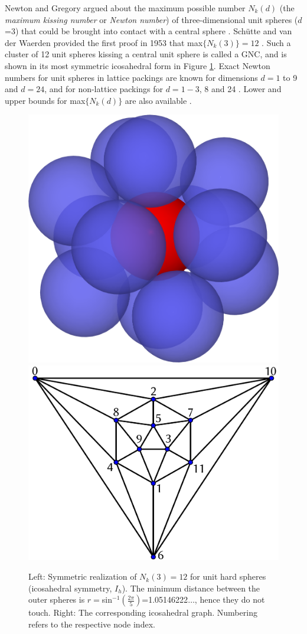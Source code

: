 Newton and Gregory argued about the maximum possible number $N_k(d)$ (the
\textit{maximum kissing number} or \textit{Newton number}) of three-dimensional
unit spheres ($d$=3) that could be brought into contact with a central sphere
\autocite{Pfender_KissingNumbersSphere_2004}. Sch\"utte and van der Waerden
provided the first proof in 1953 that max$\{N_k(3)\}=12$
\autocite{Schutte_ProblemdreizehnKugeln_1952}. Such a cluster of 12 unit
spheres kissing a central unit sphere is called a \ac{GNC}, and is shown in its
most symmetric icosahedral form in Figure \ref{fig:GN}. Exact Newton numbers
for unit spheres in lattice packings are known for dimensions $d=1$ to 9 and
$d=24$, and for non-lattice packings for $d=1-3$, 8 and 24
\autocite{conway-2013book,Musin_proof24cellconjecture_2017}.  Lower and upper
bounds for max$\{N_k(d)\}$ are also available
\autocite{Mittelmann_Highaccuracysemidefiniteprogramming_2010,conway-2013book}. 
\begin{figure}[htb]
    \centering
    \includegraphics[width=.4\textwidth]{gregory-newton/Kissing-3d.png} \quad
    \includegraphics[width=.45\textwidth]{gregory-newton/ico.pdf}
    \caption{Left: Symmetric realization of $N_k(3)=12$ for unit hard spheres
    (icosahedral symmetry, $I_h$).  The minimum distance between the outer
    spheres is $r=$sin$^{-1}\left(\frac{2\pi}{5}\right)$=1.05146222$\dots$,
    hence they do not touch. Right: The corresponding icosahedral graph.
    Numbering refers to the respective node index.}
    \label{fig:GN}
\end{figure}

